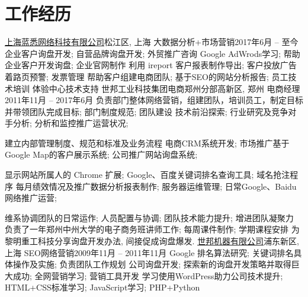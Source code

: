 \section{\textbf{工作经历}}
  \resumeSubHeadingListStart
    \resumeSubheading
      {\href{http://www.lanthy.com/}{上海蓝悉网络科技有限公司}}{松江区, 上海}
      {大数据分析+市场营销}{2017年6月 -- 至今}
      \resumeItemListStart
          {企业客户询盘开发; 自营品牌询盘开发; 外贸推广咨询}
          {Google AdWrods学习; 帮助企业客户开发询盘; 企业官网制作}
          {利用 ireport 客户报表制作导出; 客户投放广告着路页预警; 发票管理}
          {帮助客户组建电商团队; 基于SEO的网站分析报告; 员工技术培训}
          {体验中心技术支持}
      \resumeItemListEnd
    \resumeSubheading
      {世邦工业科技集团电商郑州分部}{高新区, 郑州}
      {电商经理}{2011年11月 -- 2017年6月}
      \resumeItemListStart
          {负责部门整体网络营销，组建团队，培训员工，制定目标并带领团队完成目标; 部门制度规范; 团队建设}
          {技术前沿探索; 行业研究及竞争对手分析; 分析和监控推广运营状况;}

          {建立内部管理制度、规范和标准及业务流程}
          {电商CRM系统开发; 市场推广基于Google Map的客户展示系统; 公司推广网站询盘系统; }

          {显示网站所属人的 Chrome 扩展; Google、百度关键词排名查询工具; 域名抢注程序 }
          {每月绩效情况及推广数据分析报表制作; 服务器运维管理; 日常Google、Baidu网络推广运营;}

          {维系协调团队的日常运作; 人员配置与协调; 团队技术能力提升; 增进团队凝聚力}
          {负责了一年郑州中州大学的电子商务班讲师工作; 每周课件制作; 学期课程安排}
          {为黎明重工科技分享询盘开发办法, 间接促成询盘爆发.}
      \resumeItemListEnd
    \resumeSubheading
      {\href{http://www.shibangchina.com/}{世邦机器有限公司}}{浦东新区, 上海}
      {SEO网络营销}{2009年11月 -- 2011年11月}
      \resumeItemListStart
          {Google 排名算法研究; 关键词排名具体操作及实施; 负责团队工作规划}
          {公司询盘开发; 探索新的询盘开发策略并取得巨大成功; 全网营销学习; 营销工具开发}
          {学习使用WordPress助力公司技术提升; HTML+CSS标准学习; JavaScript学习; PHP+Python}
      \resumeItemListEnd
  \resumeSubHeadingListEnd
